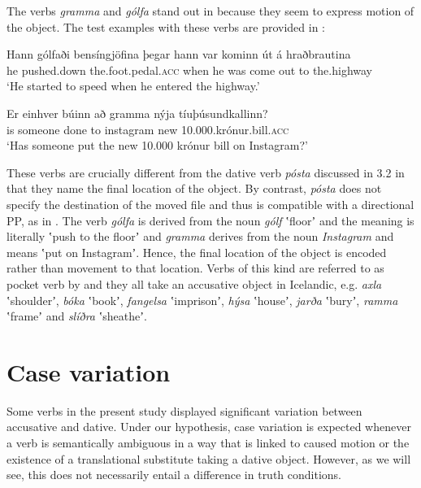\documentclass[output=paper,modfonts,nonflat,colorlinks,citecolor=brown]{langsci/langscibook}
\begin{document}
The verbs \textit{gramma} and \textit{gólfa} stand out in  because they seem to express motion of the object. The test examples with these verbs are provided in :


 
\ea%
    \label{ex:jonsson:6}
    \ea
\gll  Hann  gólfaði  bensíngjöfina  þegar  hann  var  kominn  út  á  hraðbrautina\\
   he  pushed.down  the.foot.pedal.\textsc{acc}  when  he  was  come  out  to  the.highway\\
   \glt `He started to speed when he entered the highway.' 

\ex
\gll   Er  einhver  búinn  að  gramma  nýja  tíuþúsundkallinn?\\
 is  someone  done  to  instagram  new  10.000.krónur.bill.\textsc{acc}\\
\glt `Has someone put the new 10.000 krónur bill on Instagram?'
\z
\z


These verbs are crucially different from the dative verb \textit{pósta}  discussed in 3.2 in that they name the final location of the object. By contrast, \textit{pósta} does not specify the destination of the moved file and thus is compatible with a directional PP, as in . The verb \textit{gólfa} is derived from the noun \textit{gólf} ʽfloorʼ and the meaning is literally ʽpush to the floorʼ and \textit{gramma} derives from the noun \textit{Instagram} and means ʽput on Instagramʼ. Hence, the final location of the object is encoded rather than movement to that location. Verbs of this kind are referred to as pocket verb by \citet{Levin1993} and they all take an accusative object in Icelandic, e.g. \textit{axla} ʽshoulderʼ, \textit{bóka} ʽbookʼ, \textit{fangelsa} ʽimprisonʼ, \textit{hýsa} ʽhouseʼ, \textit{jarða} ʽburyʼ, \textit{ramma} ʽframeʼ and \textit{slíðra} ʽsheatheʼ. 

\section{Case variation}  %

Some verbs in the present study displayed significant variation between accusative and dative. Under our hypothesis, case variation is expected whenever a verb is semantically ambiguous in a way that is linked to caused motion or the existence of a translational substitute taking a dative object. However, as we will see, this does not necessarily entail a difference in truth conditions.
\end{document}
